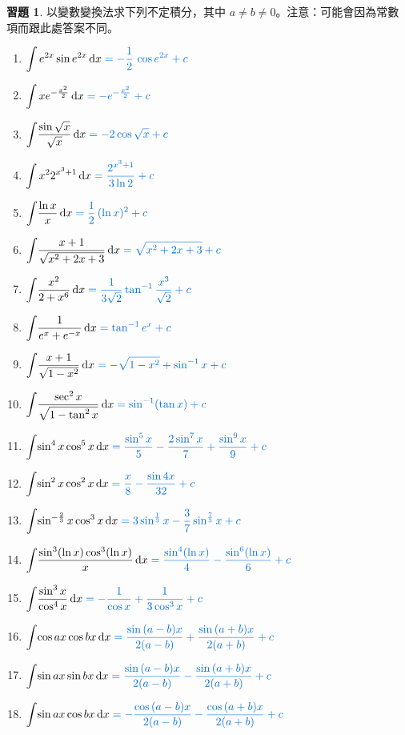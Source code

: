 \documentclass[12pt]{extarticle}
\newcommand{\ds}{\displaystyle}
\theoremstyle{definition}
\newtheorem*{exe}{習題}
\begin{document}
\begin{exe} 以變數變換法求下列不定積分，其中 $a\ne b\ne 0$。注意：可能會因為常數項而跟此處答案不同。
  \setlength{\columnsep}{-2cm}
  \begin{multicols}{2}
    \begin{enumerate}\setlength{\itemsep}{0pt}
      \item $\ds\int e^{2x}\sin{e^{2x}}\,\mathrm{d}x {\color{C2}\;= -\frac{1}{2}\,\cos{e^{2x}} + c}$
      \item $\ds\int x e^{-\frac{x^2}{2}}\,\mathrm{d}x {\color{C2}\;= -e^{-\frac{x^2}{2}} + c}$
      \item $\ds\int\!\frac{\sin{\sqrt{x}}}{\sqrt{x}}\,\mathrm{d}x {\color{C2}\;= -2\cos{\sqrt{x}} + c}$
      \item $\ds\int x^2 2^{x^3 + 1}\,\mathrm{d}x {\color{C2}\;= \frac{2^{x^3 + 1}}{3\ln 2} + c}$
      \item $\ds\int\!\frac{\ln x}{x}\,\mathrm{d}x {\color{C2}\;= \frac{1}{2}\,(\ln x)^2 + c}$
      \item $\ds\int\!\frac{x + 1}{\sqrt{x^2 + 2x + 3}}\,\mathrm{d}x {\color{C2}\;= \sqrt{x^2 + 2x + 3} + c}$
      \item $\ds\int\!\frac{x^2}{2 + x^6}\,\mathrm{d}x {\color{C2}\;= \frac{1}{3\sqrt{2}}\tan^{-1}{\frac{x^3}{\sqrt{2}}} + c}$
      \item $\ds\int\!\frac{1}{e^x + e^{-x}}\,\mathrm{d}x {\color{C2}\;= \tan^{-1}{e^{x}} + c}$
      \item $\ds\int\!\frac{x + 1}{\sqrt{1 - x^2}}\,\mathrm{d}x {\color{C2}\;= -\sqrt{1 - x^2} + \sin^{-1} x + c}$
      \item $\ds\int\!\frac{\sec^2 x}{\sqrt{1 - \tan^2 x}}\,\mathrm{d}x {\color{C2}\;= \sin^{-1}(\tan{x}) + c}$
      \item $\ds\int\!\sin^4 x\cos^5 x\,\mathrm{d}x {\color{C2}\;= \frac{\sin^5 x}{5} - \frac{2\sin^7 x}{7} + \frac{\sin^9 x}{9} + c}$
      \item $\ds\int\!\sin^2 x\cos^2 x\,\mathrm{d}x {\color{C2}\;= \frac{x}{8} - \frac{\sin 4x}{32} + c}$
      \item $\ds\int\!\sin^{-\frac{2}{3}} x\cos^3 x\,\mathrm{d}x {\color{C2}\;= 3\sin^{\frac{1}{3}}x - \frac{3}{7}\sin^{\frac{7}{3}}x + c}$
      \item $\ds\int\!\frac{\sin^3(\ln x)\cos^3(\ln x)}{x}\,\mathrm{d}x {\color{C2}\;= \frac{\sin^4(\ln x)}{4} - \frac{\sin^6(\ln x)}{6} + c}$
      \item $\ds\int\!\frac{\sin^3 x}{\cos^4 x}\,\mathrm{d}x {\color{C2}\;= -\frac{1}{\cos x} + \frac{1}{3\cos^3 x} + c}$
      \item $\ds\int\!\cos ax\cos bx\,\mathrm{d}x {\color{C2}\;= \frac{\sin{(a-b)x}}{2(a-b)} + \frac{\sin{(a+b)x}}{2(a+b)} + c}$
      \item $\ds\int\!\sin ax\sin bx\,\mathrm{d}x {\color{C2}\;= \frac{\sin{(a-b)x}}{2(a-b)} - \frac{\sin{(a+b)x}}{2(a+b)} + c}$
      \item $\ds\int\!\sin ax\cos bx\,\mathrm{d}x {\color{C2}\;= -\frac{\cos{(a-b)x}}{2(a-b)} - \frac{\cos{(a+b)x}}{2(a+b)} + c}$
    \end{enumerate} 
  \end{multicols}
\end{exe}
\end{document}
